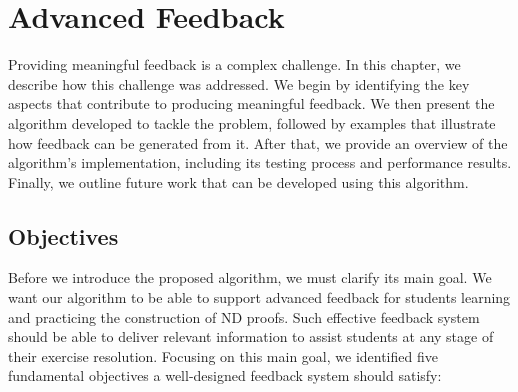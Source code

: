%

\chapter{Advanced Feedback}
\label{chap:algo}

Providing meaningful feedback is a complex challenge. In this chapter, we describe how this challenge was addressed. We begin by identifying the key aspects that contribute to producing meaningful feedback. We then present the algorithm developed to tackle the problem, followed by examples that illustrate how feedback can be generated from it. After that, we provide an overview of the algorithm’s implementation, including its testing process and performance results. Finally, we outline future work that can be developed using this algorithm.

\section{Objectives}
Before we introduce the proposed algorithm, we must clarify its main goal. We want our algorithm to be able to support advanced feedback for students learning and practicing the construction of \gls{ND} proofs. Such effective feedback system should be able to deliver relevant information to assist students at any stage of their exercise resolution. Focusing on this main goal, we identified five fundamental objectives a well-designed feedback system should satisfy:

